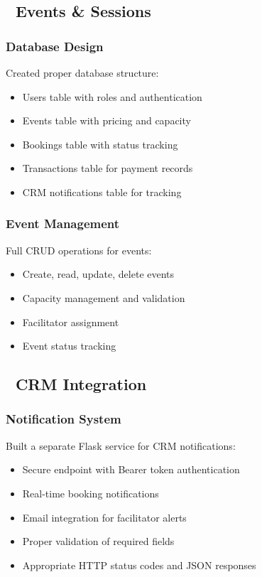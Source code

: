 \documentclass[12pt,a4paper]{article}
\begin{document}
\subsection{📅 Events \& Sessions}
\subsubsection{Database Design}
Created proper database structure:
\begin{itemize}
    \item Users table with roles and authentication
    \item Events table with pricing and capacity
    \item Bookings table with status tracking
    \item Transactions table for payment records
    \item CRM notifications table for tracking
\end{itemize}

\subsubsection{Event Management}
Full CRUD operations for events:
\begin{itemize}
    \item Create, read, update, delete events
    \item Capacity management and validation
    \item Facilitator assignment
    \item Event status tracking
\end{itemize}

\subsection{🔔 CRM Integration}
\subsubsection{Notification System}
Built a separate Flask service for CRM notifications:
\begin{itemize}
    \item Secure endpoint with Bearer token authentication
    \item Real-time booking notifications
    \item Email integration for facilitator alerts
    \item Proper validation of required fields
    \item Appropriate HTTP status codes and JSON responses
\end{itemize}
\end{document}

